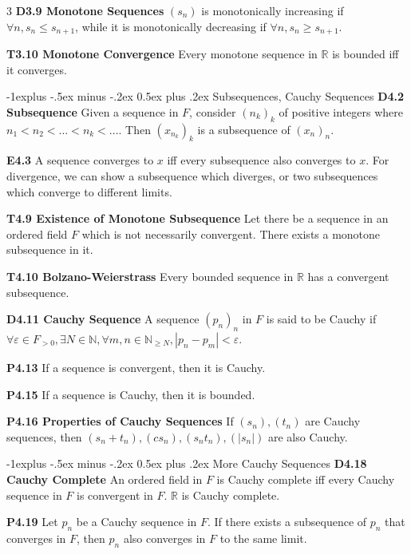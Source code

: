\documentclass[10pt, landscape]{article}
\makeatletter
\renewcommand{\section}{\@startsection{section}{1}{0mm}%
                                {-1ex plus -.5ex minus -.2ex}%
                                {0.5ex plus .2ex}%
                                {\normalfont\large\bfseries}}
\renewcommand{\section}{\@startsection{section}{2}{0mm}%
                                {-1explus -.5ex minus -.2ex}%
                                {0.5ex plus .2ex}%
                                {\normalfont\normalsize\bfseries}}
\makeatother
\begin{document}
\begin{multicols*}{3}
\textbf{D3.9 Monotone Sequences} $(s_n)$ is monotonically increasing if $\forall n,s_n \leq s_{n+1}$, while it is monotonically decreasing if $\forall n, s_n \geq s_{n+1}$.

\textbf{T3.10 Monotone Convergence} Every monotone sequence in $\mathbb{R}$ is bounded iff it converges.

\section{Subsequences, Cauchy Sequences}
\textbf{D4.2 Subsequence} Given a sequence in $F$, consider $(n_k)_k$ of positive integers where $n_1<n_2<...<n_k<...$. Then $(x_{n_k})_k$ is a subsequence of $(x_n)_n$.

\textbf{E4.3} A sequence converges to $x$ iff every subsequence also converges to $x$. For divergence, we can show a subsequence which diverges, or two subsequences which converge to different limits.

\textbf{T4.9 Existence of Monotone Subsequence} Let there be a sequence in an ordered field $F$ which is not necessarily convergent. There exists a monotone subsequence in it.

\textbf{T4.10 Bolzano-Weierstrass} Every bounded sequence in $\mathbb{R}$ has a convergent subsequence.

\textbf{D4.11 Cauchy Sequence} A sequence $(p_n)_n$ in $F$ is said to be Cauchy if $\forall \varepsilon \in F_{>0}, \exists N \in \mathbb{N}, \forall m,n \in \mathbb{N}_{\geq N}, |p_n-p_m|<\varepsilon$.

\textbf{P4.13} If a sequence is convergent, then it is Cauchy.

\textbf{P4.15} If a sequence is Cauchy, then it is bounded.

\textbf{P4.16 Properties of Cauchy Sequences} If $(s_n),(t_n)$ are Cauchy sequences, then $(s_n+t_n), (cs_n), (s_nt_n), (|s_n|)$ are also Cauchy.

\section{More Cauchy Sequences}
\textbf{D4.18 Cauchy Complete} An ordered field in $F$ is Cauchy complete iff every Cauchy sequence in $F$ is convergent in 
$F$. $\mathbb{R}$ is Cauchy complete.

\textbf{P4.19} Let $p_n$ be a Cauchy sequence in $F$. If there exists a subsequence of $p_n$ that converges in $F$, then $p_n$ also converges in $F$ to the same limit.


\end{multicols*}
\end{document}
